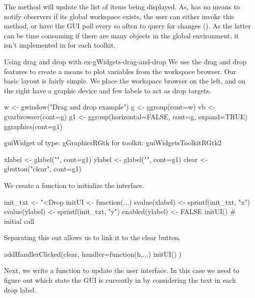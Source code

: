 The  method will update the list of items
being displayed.  As, \R\/ has no means to notify observers if its
global workspace exists, the user can either invoke this method, or
have the GUI poll every so often to query
for changes (). As the latter can be time consuming if there are many objects
in the global environment, it isn't implemented in for each toolkit.

\begin{example}{Using drag and drop with }{ex-gWidgets-drag-and-drop}
  We use the drag and drop features to create a means to plot
  variables from the workspace browser.  Our basic layout is fairly
  simple. We place the workspace browser on the left, and on the right
  have a graphic device and few labels to act as drop targets.
\begin{Schunk}
\begin{Sinput}
 w <- gwindow("Drag and drop example")
 g <- ggroup(cont=w)
 vb <- gvarbrowser(cont=g)
 g1 <- ggroup(horizontal=FALSE, cont=g, expand=TRUE)
 ggraphics(cont=g1)
\end{Sinput}
\begin{Soutput}
guiWidget of type: gGraphicsRGtk for toolkit: guiWidgetsToolkitRGtk2 
\end{Soutput}
\begin{Sinput}
 xlabel <- glabel("", cont=g1)
 ylabel <- glabel("", cont=g1)
 clear <- gbutton("clear", cont=g1)
\end{Sinput}
\end{Schunk}
%
We create a function to initialize the interface.
\begin{Schunk}
\begin{Sinput}
 init_txt <- "<Drop %
 initUI <- function(...) {
   svalue(xlabel) <- sprintf(init_txt, "x")
   svalue(ylabel) <- sprintf(init_txt, "y")
   enabled(ylabel) <- FALSE
 }
 initUI()                                # initial call
\end{Sinput}
\end{Schunk}
%
Separating this out allows us to link it to the clear button.
\begin{Schunk}
\begin{Sinput}
 addHandlerClicked(clear, handler=function(h,...) {
   initUI()
 })
\end{Sinput}
\end{Schunk}
%
Next, we write a function to update the user interface. In this case
we need to figure out which state the GUI is currently in by
considering the text in each drop label.

\end{example}
